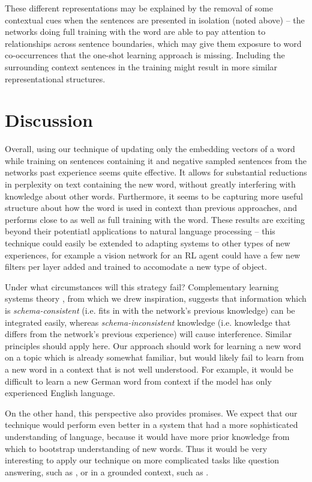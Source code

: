\documentclass{article}
\begin{document}
These different representations may be explained by the removal of some contextual cues when the sentences are presented in isolation (noted above) -- the networks doing full training with the word are able to pay attention to relationships across sentence boundaries, which may give them exposure to word co-occurrences that the one-shot learning approach is missing. Including the surrounding context sentences in the training might result in more similar representational structures. \par
\section{Discussion}
Overall, using our technique of updating only the embedding vectors of a word while training on sentences containing it and negative sampled sentences from the networks past experience seems quite effective. It allows for substantial reductions in perplexity on text containing the new word, without greatly interfering with knowledge about other words. Furthermore, it seems to be capturing more useful structure about how the word is used in context than previous approaches, and performs close to as well as full training with the word. These results are exciting beyond their potentiatl applications to natural language processing -- this technique could easily be extended to adapting systems to other types of new experiences, for example a vision network for an RL agent could have a few new filters per layer added and trained to accomodate a new type of object. \par 
Under what circumstances will this strategy fail? Complementary learning systems theory \citep{Kumaran2016}, from which we drew inspiration, suggests that information which is \emph{schema-consistent} (i.e. fits in with the network's previous knowledge) can be integrated easily, whereas \emph{schema-inconsistent} knowledge (i.e. knowledge that differs from the network's previous experience) will cause interference. Similar principles should apply here. Our approach should work for learning a new word on a topic which is already somewhat familiar, but would likely fail to learn from a new word in a context that is not well understood. For example, it would be difficult to learn a new German word from context if the model has only experienced English language. \par  
On the other hand, this perspective also provides promises. We expect that our technique would perform even better in a system that had a more sophisticated understanding of language, because it would have more prior knowledge from which to bootstrap understanding of new words. Thus it would be very interesting to apply our technique on more complicated tasks like question answering, such as \citet{Santoro2017}, or in a grounded context, such as \citet{Hermann2017}. \par 
\end{document}
